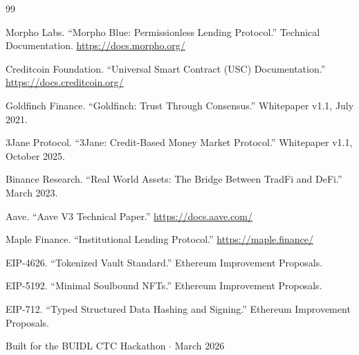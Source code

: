 \documentclass[11pt,a4paper]{article}
\begin{document}
\begin{thebibliography}{99}

Morpho Labs. ``Morpho Blue: Permissionless Lending Protocol.'' Technical Documentation. \url{https://docs.morpho.org/}

Creditcoin Foundation. ``Universal Smart Contract (USC) Documentation.'' \url{https://docs.creditcoin.org/}

Goldfinch Finance. ``Goldfinch: Trust Through Consensus.'' Whitepaper v1.1, July 2021.

3Jane Protocol. ``3Jane: Credit-Based Money Market Protocol.'' Whitepaper v1.1, October 2025.

Binance Research. ``Real World Assets: The Bridge Between TradFi and DeFi.'' March 2023.

Aave. ``Aave V3 Technical Paper.'' \url{https://docs.aave.com/}

Maple Finance. ``Institutional Lending Protocol.'' \url{https://maple.finance/}

EIP-4626. ``Tokenized Vault Standard.'' Ethereum Improvement Proposals.

EIP-5192. ``Minimal Soulbound NFTs.'' Ethereum Improvement Proposals.

EIP-712. ``Typed Structured Data Hashing and Signing.'' Ethereum Improvement Proposals.

\end{thebibliography}

\vfill

\begin{center}
\color{TextSecondary}\small\sffamily
Built for the BUIDL CTC Hackathon $\cdot$ March 2026
\end{center}
\end{document}
